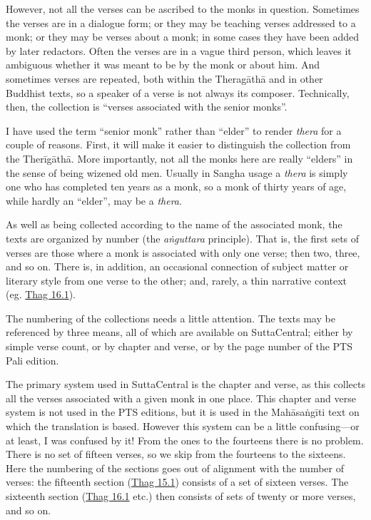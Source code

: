 \documentclass[12pt,openany]{book}%
\begin{document}
However, not all the verses can be ascribed to the monks in question. Sometimes the verses are in a dialogue form; or they may be teaching verses addressed to a monk; or they may be verses about a monk; in some cases they have been added by later redactors. Often the verses are in a vague third person, which leaves it ambiguous whether it was meant to be by the monk or about him. And sometimes verses are repeated, both within the \textsanskrit{Theragāthā} and in other Buddhist texts, so a speaker of a verse is not always its composer. Technically, then, the collection is “verses associated with the senior monks”.

I have used the term “senior monk” rather than “elder” to render \textit{thera} for a couple of reasons. First, it will make it easier to distinguish the collection from the \textsanskrit{Therīgāthā}. More importantly, not all the monks here are really “elders” in the sense of being wizened old men. Usually in Sangha usage a \textit{thera} is simply one who has completed ten years as a monk, so a monk of thirty years of age, while hardly an “elder”, may be a \textit{thera}.

As well as being collected according to the name of the associated monk, the texts are organized by number (the \textit{\textsanskrit{aṅguttara}} principle). That is, the first sets of verses are those where a monk is associated with only one verse; then two, three, and so on. There is, in addition, an occasional connection of subject matter or literary style from one verse to the other; and, rarely, a thin narrative context (eg. \href{https://suttacentral.net/thag16.1}{Thag 16.1}).

The numbering of the collections needs a little attention. The texts may be referenced by three means, all of which are available on SuttaCentral; either by simple verse count, or by chapter and verse, or by the page number of the PTS Pali edition.

The primary system used in SuttaCentral is the chapter and verse, as this collects all the verses associated with a given monk in one place. This chapter and verse system is not used in the PTS editions, but it is used in the \textsanskrit{Mahāsaṅgīti} text on which the translation is based. However this system can be a little confusing—or at least, I was confused by it! From the ones to the fourteens there is no problem. There is no set of fifteen verses, so we skip from the fourteens to the sixteens. Here the numbering of the sections goes out of alignment with the number of verses: the fifteenth section (\href{https://suttacentral.net/thag15.1}{Thag 15.1}) consists of a set of sixteen verses. The sixteenth section (\href{https://suttacentral.net/thag16.1}{Thag 16.1} etc.) then consists of sets of twenty or more verses, and so on.
\end{document}
